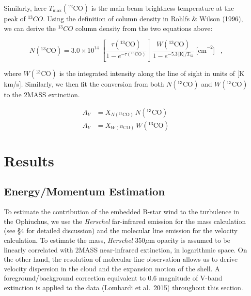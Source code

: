 \documentclass[11pt,a4paper]{emulateapj}
\begin{document}
Similarly, here $T_{\text{max}}(^{12}\text{CO})$ is the main beam brightness temperature at the peak of $^{13}CO$. Using the definition of column density in Rohlfs \& Wilson (1996), we can derive the $^{13}CO$ column density from the two equations above:

\begin{equation}
N(^{13}\text{CO}) = 3.0\times10^{14}\;\left[\frac{\tau(^{13}\text{CO})}{1-e^{-\tau(^{13}\text{CO})}}\right]\,\frac{W(^{13}\text{CO})}{1-e^{-5.3\,\text{[K]}/T_{\text{ex}}}}\;\text{[cm}^{-2}\text{]}\;\;\;\text{,}
\end{equation}

where $W(^{13}\text{CO})$ is the integrated intensity along the line of sight in units of [K km/s]. Similarly, we then fit the conversion from both $N(^{13}\text{CO})$ and $W(^{13}\text{CO})$ to the 2MASS extinction.

\begin{equation}
\begin{aligned}
A_V &= X_{N(^{13}\text{CO})}\,N(^{13}\text{CO}) \\
A_V &= X_{W(^{13}\text{CO})}\,W(^{13}\text{CO})
\end{aligned}
\end{equation}


\section{Results}
\label{sec:results}

\subsection{Energy/Momentum Estimation}
\label{sec:energy_momentum}
To estimate the contribution of the embedded B-star wind to the turbulence in the Ophiuchus, we use the {\it Herschel} far-infrared emission for the mass calculation (see \S4 for detailed discussion) and the molecular line emission for the velocity calculation. To estimate the mass, {\it Herschel} 350$\mu$m opacity is assumed to be linearly correlated with 2MASS near-infrared extinction, in logarithmic space. On the other hand, the resolution of molecular line observation allows us to derive velocity dispersion in the cloud and the expansion motion of the shell. A foreground/background correction equivalent to 0.6 magnitude of V-band extinction is applied to the data (Lombardi et al.\ 2015) throughout this section.

\end{document}
